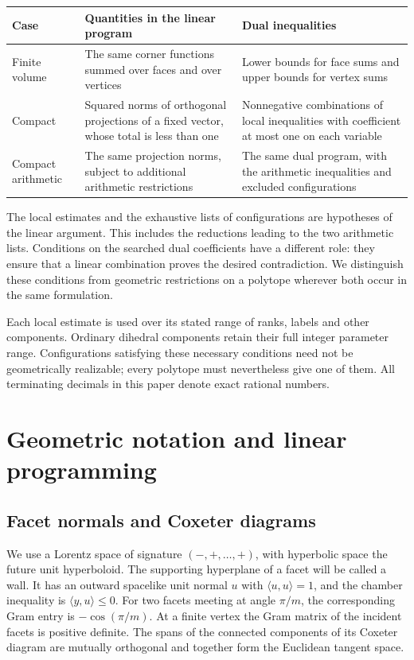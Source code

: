 \documentclass[11pt]{article}
\theoremstyle{definition}
\theoremstyle{remark}
\numberwithin{equation}{section}
\newcommand{\ip}[2]{\langle #1,#2\rangle}
\begin{document}
\begin{center}\small
\begin{tabular}{>{\raggedright\arraybackslash}p{.15\linewidth}
 >{\raggedright\arraybackslash}p{.41\linewidth}
 >{\raggedright\arraybackslash}p{.34\linewidth}}
\toprule
Case&Quantities in the linear program&Dual inequalities\\\midrule
Finite volume&The same corner functions summed over faces and over
 vertices&Lower bounds for face sums and upper bounds for vertex sums\\
Compact&Squared norms of orthogonal projections of a fixed vector,
 whose total is less than one&Nonnegative combinations of local
 inequalities with coefficient at most one on each variable\\
Compact arithmetic&The same projection norms, subject to additional
 arithmetic restrictions&The same dual program, with the arithmetic
 inequalities and excluded configurations\\\bottomrule
\end{tabular}
\end{center}

The local estimates and the exhaustive lists of configurations are
hypotheses of the linear argument. This includes the reductions
leading to the two arithmetic lists. Conditions on the searched dual
coefficients have a different role: they ensure that a linear
combination proves the desired contradiction. We distinguish these
conditions from geometric restrictions on a polytope wherever both
occur in the same formulation.

Each local estimate is used over its stated range of ranks, labels
and other components. Ordinary dihedral components retain their full
integer parameter range. Configurations satisfying these necessary
conditions need not be geometrically realizable; every polytope must
nevertheless give one of them. All terminating decimals in this paper
denote exact rational numbers.

\section{Geometric notation and linear programming}
\label{sec:framework}

\subsection{Facet normals and Coxeter diagrams}

We use a Lorentz space of signature $(-,+,\ldots,+)$, with hyperbolic
space the future unit hyperboloid. The supporting hyperplane of a
facet will be called a wall. It has an outward spacelike unit
normal $u$ with $\ip{u}{u}=1$, and the chamber inequality is
$\ip{y}{u}\le0$. For two facets meeting at angle $\pi/m$, the corresponding Gram
entry is $-\cos(\pi/m)$. At a finite vertex the Gram matrix of the
incident facets is positive definite. The spans of the connected
components of its Coxeter diagram are mutually orthogonal and together
form the Euclidean tangent space.
\end{document}
